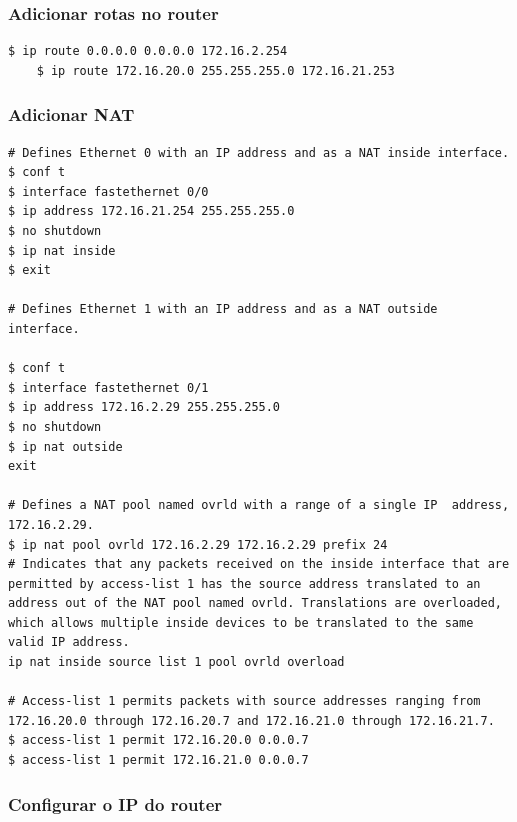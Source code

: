 \documentclass[11pt]{article}
\begin{document}
\bigskip

\subsubsection{Adicionar rotas no router}

\begin{lstlisting}[style=bashStyle]
    $ ip route 0.0.0.0 0.0.0.0 172.16.2.254
    $ ip route 172.16.20.0 255.255.255.0 172.16.21.253
\end{lstlisting}

\bigskip

\subsubsection{Adicionar NAT}

\begin{lstlisting}[style=bashStyle]
# Defines Ethernet 0 with an IP address and as a NAT inside interface.
$ conf t            
$ interface fastethernet 0/0
$ ip address 172.16.21.254 255.255.255.0
$ no shutdown
$ ip nat inside        
$ exit
 
# Defines Ethernet 1 with an IP address and as a NAT outside interface.

$ conf t
$ interface fastethernet 0/1
$ ip address 172.16.2.29 255.255.255.0
$ no shutdown
$ ip nat outside       
exit
 
# Defines a NAT pool named ovrld with a range of a single IP  address, 172.16.2.29.
$ ip nat pool ovrld 172.16.2.29 172.16.2.29 prefix 24
# Indicates that any packets received on the inside interface that are permitted by access-list 1 has the source address translated to an address out of the NAT pool named ovrld. Translations are overloaded, which allows multiple inside devices to be translated to the same valid IP address.
ip nat inside source list 1 pool ovrld overload
 
# Access-list 1 permits packets with source addresses ranging from 172.16.20.0 through 172.16.20.7 and 172.16.21.0 through 172.16.21.7.
$ access-list 1 permit 172.16.20.0 0.0.0.7
$ access-list 1 permit 172.16.21.0 0.0.0.7

\end{lstlisting}

\bigskip

\subsubsection{Configurar o IP do router}
\end{document}
